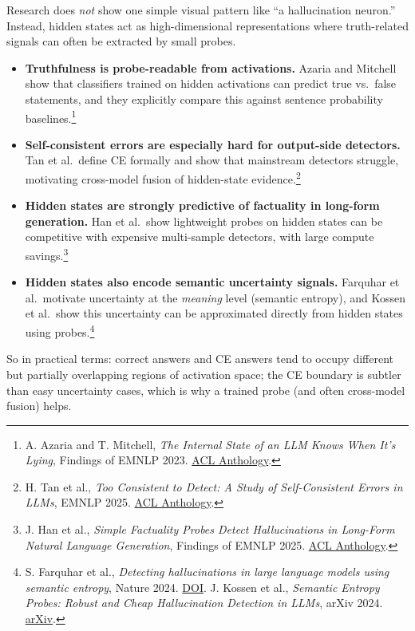 \documentclass[11pt]{article}
\begin{document}
Research does \emph{not} show one simple visual pattern like ``a hallucination neuron.'' Instead, hidden states act as high-dimensional representations where truth-related signals can often be extracted by small probes.

\begin{itemize}
    \item \textbf{Truthfulness is probe-readable from activations.} Azaria and Mitchell show that classifiers trained on hidden activations can predict true vs.\ false statements, and they explicitly compare this against sentence probability baselines.\footnote{A. Azaria and T. Mitchell, \emph{The Internal State of an LLM Knows When It's Lying}, Findings of EMNLP 2023. \href{https://aclanthology.org/2023.findings-emnlp.68/}{ACL Anthology}.}
    \item \textbf{Self-consistent errors are especially hard for output-side detectors.} Tan et al.\ define CE formally and show that mainstream detectors struggle, motivating cross-model fusion of hidden-state evidence.\footnote{H. Tan et al., \emph{Too Consistent to Detect: A Study of Self-Consistent Errors in LLMs}, EMNLP 2025. \href{https://aclanthology.org/2025.emnlp-main.238/}{ACL Anthology}.}
    \item \textbf{Hidden states are strongly predictive of factuality in long-form generation.} Han et al.\ show lightweight probes on hidden states can be competitive with expensive multi-sample detectors, with large compute savings.\footnote{J. Han et al., \emph{Simple Factuality Probes Detect Hallucinations in Long-Form Natural Language Generation}, Findings of EMNLP 2025. \href{https://aclanthology.org/2025.findings-emnlp.880/}{ACL Anthology}.}
    \item \textbf{Hidden states also encode semantic uncertainty signals.} Farquhar et al.\ motivate uncertainty at the \emph{meaning} level (semantic entropy), and Kossen et al.\ show this uncertainty can be approximated directly from hidden states using probes.\footnote{S. Farquhar et al., \emph{Detecting hallucinations in large language models using semantic entropy}, Nature 2024. \href{https://doi.org/10.1038/s41586-024-07421-0}{DOI}. J. Kossen et al., \emph{Semantic Entropy Probes: Robust and Cheap Hallucination Detection in LLMs}, arXiv 2024. \href{https://arxiv.org/abs/2406.15927}{arXiv}.}
\end{itemize}

So in practical terms: correct answers and CE answers tend to occupy different but partially overlapping regions of activation space; the CE boundary is subtler than easy uncertainty cases, which is why a trained probe (and often cross-model fusion) helps.
\end{document}
